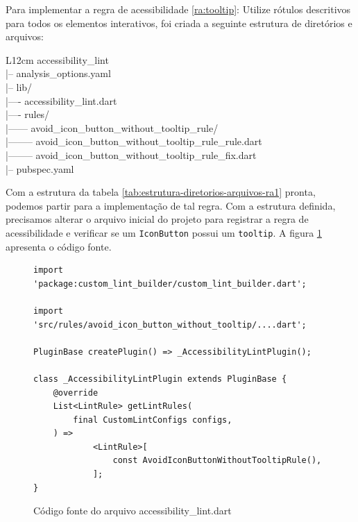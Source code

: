 Para implementar a regra de acessibilidade \ref{ra:tooltip}: Utilize rótulos descritivos para todos os elementos interativos, foi criada a seguinte estrutura de diretórios e arquivos:

\begin{table}[!htbp]
	\centering
	\renewcommand{\arraystretch}{1.1}
	\caption{Estrutura de diretórios e arquivos para a regra de acessibilidade \ref{ra:tooltip}}
	\label{tab:estrutura-diretorios-arquivos-ra1}
	\ttfamily
	\begin{tabular}{ L{12cm} }
		\hline
		accessibility\_lint \\
		|-- analysis\_options.yaml \\
		|-- lib/ \\
		|---- accessibility\_lint.dart \\
		|---- rules/ \\
		|------ avoid\_icon\_button\_without\_tooltip\_rule/ \\
		|-------- avoid\_icon\_button\_without\_tooltip\_rule\_rule.dart \\
		|-------- avoid\_icon\_button\_without\_tooltip\_rule\_fix.dart \\
		|-- pubspec.yaml \\
		\hline
	\end{tabular}
	\fontfamily{\rmdefault}\selectfont
	\vspace{2mm}
\end{table}

Com a estrutura da tabela \ref{tab:estrutura-diretorios-arquivos-ra1} pronta, podemos partir para a implementação de tal regra. 
Com a estrutura definida, precisamos alterar o arquivo inicial do projeto  para registrar a regra de acessibilidade e verificar se um \texttt{IconButton} possui um \texttt{tooltip}. A figura \ref{fig:accessibility-lint} apresenta o código fonte.

\begin{figure}[!htbp]
\centering
\caption{Código fonte do arquivo accessibility\_lint.dart}\label{fig:accessibility-lint}
\begin{lstlisting}
import 'package:custom_lint_builder/custom_lint_builder.dart';

import 'src/rules/avoid_icon_button_without_tooltip/....dart';

PluginBase createPlugin() => _AccessibilityLintPlugin();

class _AccessibilityLintPlugin extends PluginBase {
	@override
	List<LintRule> getLintRules(
		final CustomLintConfigs configs,
	) =>
			<LintRule>[
				const AvoidIconButtonWithoutTooltipRule(),
			];
}		
\end{lstlisting}
\vspace{2mm}
\end{figure}

